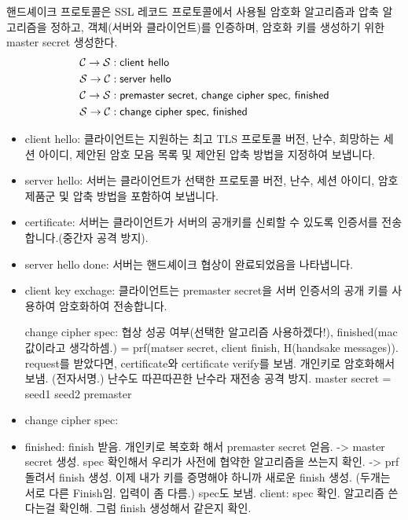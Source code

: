 핸드셰이크 프로토콜은 SSL 레코드 프로토콜에서 사용될 암호화 알고리즘과 압축
알고리즘을 정하고, 객체(서버와 클라이언트)를 인증하며, 암호화 키를 생성하기 위한
master secret 생성한다.
\begin{equation}
  \begin{split}
    \mathcal{C} \to \mathcal{S} &: \textsf{client hello} \\
    \mathcal{S} \to \mathcal{C} &: \textsf{server hello} \\
    \mathcal{C} \to \mathcal{S} &: \textsf{premaster secret, change cipher spec, finished} \\
    \mathcal{S} \to \mathcal{C} &: \textsf{change cipher spec, finished}
  \end{split}
\end{equation}
\begin{itemize}
  \item \textsf{client hello}: 클라이언트는 지원하는 최고 TLS 프로토콜 버전,
  난수, 희망하는 세션 아이디, 제안된 암호 모음 목록 및 제안된 압축 방법을 지정하여 보냅니다.
  \item \textsf{server hello}: 서버는 클라이언트가 선택한 프로토콜 버전, 난수, 세션 아이디,
  암호 제품군 및 압축 방법을 포함하여 보냅니다.
  \item \textsf{certificate}: 서버는 클라이언트가 서버의 공개키를 신뢰할 수 있도록
  인증서를 전송합니다.(중간자 공격 방지).
  \item \textsf{server hello done}: 서버는 핸드셰이크 협상이 완료되었음을 나타냅니다.
  \item \textsf{client key exchage}: 클라이언트는 \textsf{premaster secret}을
  서버 인증서의 공개 키를 사용하여 암호화하여 전송합니다.
  
  change cipher spec: 협상 성공 여부(선택한
  알고리즘 사용하겠다!), finished(mac값이라고 생각하셈.) = prf(matser secret,
  client finish, H(handsake messages)). request를 받았다면, certificate와
  certificate verify를 보냄. 개인키로 암호화해서 보냄. (전자서명.) 난수도
  따끈따끈한 난수라 재전송 공격 방지. master secret = seed1 seed2 premaster
  \item \textsf{change cipher spec}:
  \item \textsf{finished}: finish 받음. 개인키로 복호화 해서 premaster secret 얻음. -> master secret 생성.
  spec 확인해서 우리가 사전에 협약한 알고리즘을 쓰는지 확인. -> prf 돌려서 finish 생성.
  이제 내가 키를 증명해야 하니까 새로운 finish 생성. (두개는 서로 다른 Finish임. 입력이 좀 다름.)
  spec도 보냄. client: spec 확인. 알고리즘 쓴다는걸 확인해. 그럼 finish 생성해서 같은지 확인.
\end{itemize}

